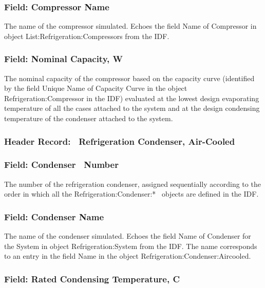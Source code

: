 \subsubsection{Field: Compressor Name}\label{field-compressor-name}

The name of the compressor simulated. Echoes the field Name of Compressor in object List:Refrigeration:Compressors from the IDF.

\subsubsection{Field: Nominal Capacity, W}\label{field-nominal-capacity-w}

The nominal capacity of the compressor based on the capacity curve (identified by the field Unique Name of Capacity Curve in the object Refrigeration:Compressor in the IDF) evaluated at the lowest design evaporating temperature of all the cases attached to the system and at the design condensing temperature of the condenser attached to the system.

\subsubsection{Header Record:~ Refrigeration Condenser, Air-Cooled}\label{header-record-refrigeration-condenser-air-cooled}

\subsubsection{Field: Condenser~ Number}\label{field-condenser-number-1}

The number of the refrigeration condenser, assigned sequentially according to the order in which all the Refrigeration:Condenser:*~ objects are defined in the IDF.

\subsubsection{Field: Condenser Name}\label{field-condenser-name-1}

The name of the condenser simulated. Echoes the field Name of Condenser for the System in object Refrigeration:System from the IDF. The name corresponds to an entry in the field Name in the object Refrigeration:Condenser:Aircooled.

\subsubsection{Field: Rated Condensing Temperature, C}\label{field-rated-condensing-temperature-c}

